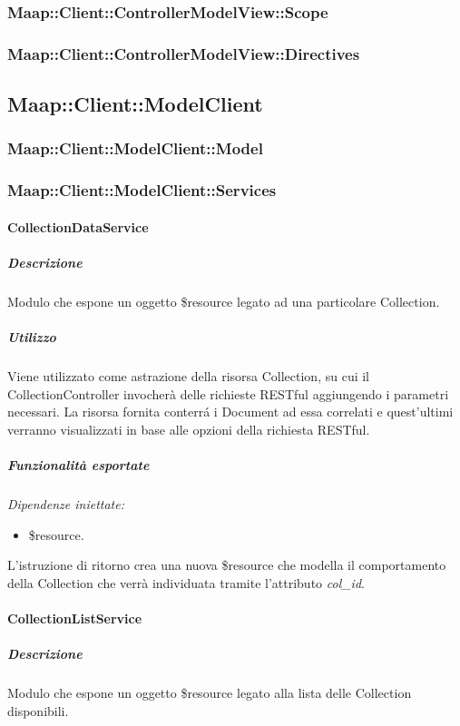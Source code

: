 \subsubsection{Maap::Client::ControllerModelView::Scope}

\subsubsection{Maap::Client::ControllerModelView::Directives}

\subsection{Maap::Client::ModelClient}

\subsubsection{Maap::Client::ModelClient::Model}

\subsubsection{Maap::Client::ModelClient::Services}

\paragraph{CollectionDataService}
\subparagraph{Descrizione}
Modulo che espone un oggetto \$resource legato ad una particolare Collection. 

\subparagraph{Utilizzo}
Viene utilizzato come astrazione della risorsa Collection, su cui il CollectionController invocherà delle richieste 
RESTful aggiungendo i parametri necessari. La risorsa fornita conterr\'{a} i Document ad essa correlati e quest'ultimi 
verranno visualizzati in base alle opzioni della richiesta RESTful.

\subparagraph{Funzionalità esportate}
\emph{Dipendenze iniettate:}
\begin{itemize}
 \item \$resource.
\end{itemize}
L'istruzione di ritorno crea una nuova \$resource che modella il comportamento della Collection 
che verrà individuata tramite l'attributo \emph{col_id}.


\paragraph{CollectionListService}
\subparagraph{Descrizione}
Modulo che espone un oggetto \$resource legato alla lista delle Collection disponibili. 

